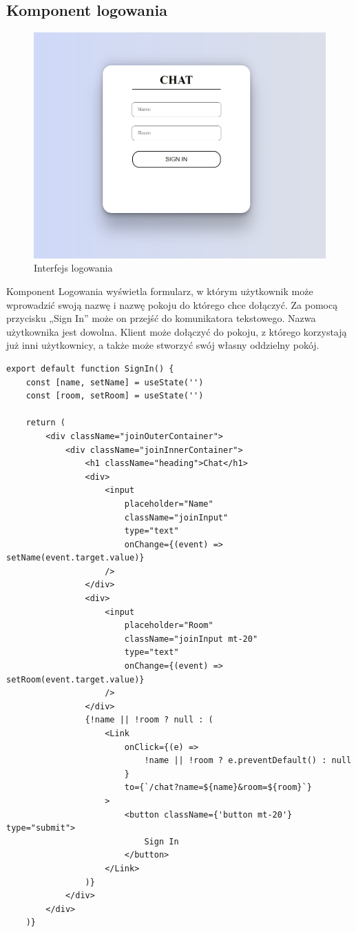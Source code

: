 \subsection{Komponent logowania}
\begin{figure}
	\centering
	\includegraphics[width=0.5\linewidth]{"obrazy/logowanie"}
	\caption{Interfejs logowania}
	\label{fig:7}
\end{figure}
Komponent Logowania wyświetla formularz, w którym użytkownik może wprowadzić swoją nazwę i nazwę pokoju do którego chce dołączyć. Za pomocą przycisku „Sign In” może on przejść do komunikatora tekstowego. Nazwa użytkownika jest dowolna. Klient może dołączyć do pokoju, z którego korzystają już inni użytkownicy, a także może stworzyć swój własny oddzielny pokój. 
\begin{lstlisting}[caption=Implementacja komponentu logowania]
export default function SignIn() {
    const [name, setName] = useState('')
    const [room, setRoom] = useState('')

    return (
        <div className="joinOuterContainer">
            <div className="joinInnerContainer">
                <h1 className="heading">Chat</h1>
                <div>
                    <input
                        placeholder="Name"
                        className="joinInput"
                        type="text"
                        onChange={(event) => setName(event.target.value)}
                    />
                </div>
                <div>
                    <input
                        placeholder="Room"
                        className="joinInput mt-20"
                        type="text"
                        onChange={(event) => setRoom(event.target.value)}
                    />
                </div>
                {!name || !room ? null : (
                    <Link
                        onClick={(e) =>
                            !name || !room ? e.preventDefault() : null
                        }
                        to={`/chat?name=${name}&room=${room}`}
                    >
                        <button className={'button mt-20'} type="submit">
                            Sign In
                        </button>
                    </Link>
                )}
            </div>
        </div>
    )}
\end{lstlisting}

